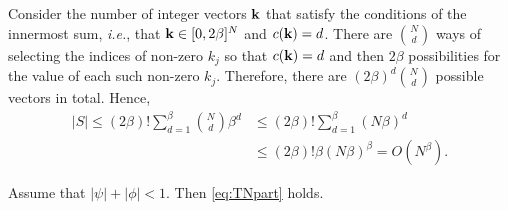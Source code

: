 \documentclass[journal]{IEEEtran}
\begin{document}
\begin{IEEEproof}
Consider the number of integer vectors $\mathbf{k}$ that satisfy the conditions of
the innermost sum, \emph{i.e.}, that $\mathbf{k} \in [0, 2\beta]^N$ and $c(\mathbf{k}) =
d$.  There are ${N \choose d}$ ways of selecting the indices of non-zero $k_j$
so that $c(\mathbf{k}) = d$ and then $2 \beta$ possibilities for the value of each
such non-zero $k_j$.  Therefore, there are $(2 \beta)^d {N \choose d}$
possible vectors in total.  Hence,
\begin{align*}
  |S| \leq (2 \beta)! \sum_{d=1}^{\beta} {N \choose d} \beta^d &\leq (2 \beta)! \sum_{d=1}^{\beta} (N \beta)^d \\ &\leq (2 \beta)! \beta (N \beta)^{\beta} = O(N^\beta).
\end{align*}
\end{IEEEproof}

\begin{lemma} \label{lem:TNparts}
Assume that $\left\vert \psi\right\vert +\left\vert\phi\right\vert <1$.  Then \eqref{eq:TNpart} holds.
\end{lemma}
\end{document}

